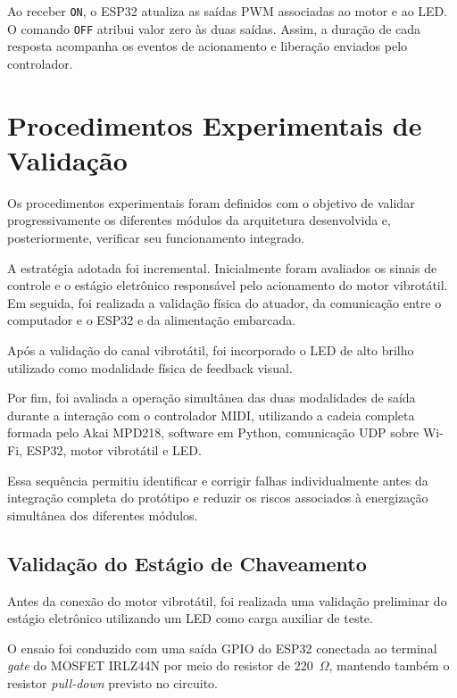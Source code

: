 Ao receber \texttt{ON}, o ESP32 atualiza as saídas PWM associadas ao motor e ao LED. O comando \texttt{OFF} atribui valor zero às duas saídas. Assim, a duração de cada resposta acompanha os eventos de acionamento e liberação enviados pelo controlador.


\section{Procedimentos Experimentais de Validação}
\label{sec:procedimentos_experimentais}

Os procedimentos experimentais foram definidos com o objetivo de validar progressivamente os diferentes módulos da arquitetura desenvolvida e, posteriormente, verificar seu funcionamento integrado.

A estratégia adotada foi incremental. Inicialmente foram avaliados os sinais de controle e o estágio eletrônico responsável pelo acionamento do motor vibrotátil. Em seguida, foi realizada a validação física do atuador, da comunicação entre o computador e o ESP32 e da alimentação embarcada.

Após a validação do canal vibrotátil, foi incorporado o LED de alto brilho utilizado como modalidade física de feedback visual.

Por fim, foi avaliada a operação simultânea das duas modalidades de saída durante a interação com o controlador MIDI, utilizando a cadeia completa formada pelo Akai MPD218, software em Python, comunicação UDP sobre Wi-Fi, ESP32, motor vibrotátil e LED.

Essa sequência permitiu identificar e corrigir falhas individualmente antes da integração completa do protótipo e reduzir os riscos associados à energização simultânea dos diferentes módulos.


\subsection{Validação do Estágio de Chaveamento}
\label{sec:validacao_chaveamento}


Antes da conexão do motor vibrotátil, foi realizada uma validação preliminar do estágio eletrônico utilizando um LED como carga auxiliar de teste.

O ensaio foi conduzido com uma saída GPIO do ESP32 conectada ao terminal \textit{gate} do MOSFET IRLZ44N por meio do resistor de 220~$\Omega$, mantendo também o resistor \textit{pull-down} previsto no circuito.

